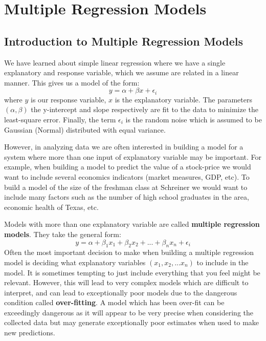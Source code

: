 \documentclass[
]{book}
\theoremstyle{definition}
\theoremstyle{definition}
\theoremstyle{definition}
\theoremstyle{definition}
\theoremstyle{remark}
\begin{document}
\hypertarget{multiple-regression-models}{%
\chapter{Multiple Regression Models}\label{multiple-regression-models}}

\hypertarget{introduction-to-multiple-regression-models}{%
\section{Introduction to Multiple Regression Models}\label{introduction-to-multiple-regression-models}}

We have learned about simple linear regression where we have a single explanatory and response variable, which we assume are related in a linear manner. This gives us a model of the form: \[ y=\alpha+\beta x+\epsilon_i\] where \(y\) is our response variable, \(x\) is the explanatory variable. The parameters \((\alpha, \beta)\) the y-intercept and slope respectively are fit to the data to minimize the least-square error. Finally, the term \(\epsilon_i\) is the random noise which is assumed to be Gaussian (Normal) distributed with equal variance.

However, in analyzing data we are often interested in building a model for a system where more than one input of explanatory variable may be important. For example, when building a model to predict the value of a stock-price we would want to include several economics indicators (market measures, GDP, etc). To build a model of the size of the freshman class at Schreiner we would want to include many factors such as the number of high school graduates in the area, economic health of Texas, etc.

Models with more than one explanatory variable are called \textbf{multiple regression models}. They take the general form:
\[ y=\alpha+\beta_1 x_1+\beta_2 x_2+...+\beta_n x_n+\epsilon_i \]
Often the most important decision to make when building a multiple regression model is deciding what explanatory variables \((x_1, x_2, ... x_n)\) to include in the model. It is sometimes tempting to just include everything that you feel might be relevant. However, this will lead to very complex models which are difficult to interpret, and can lead to exceptionally poor models due to the dangerous condition called \textbf{over-fitting}. A model which has been over-fit can be exceedingly dangerous as it will appear to be very precise when considering the collected data but may generate exceptionally poor estimates when used to make new predictions.
\end{document}
